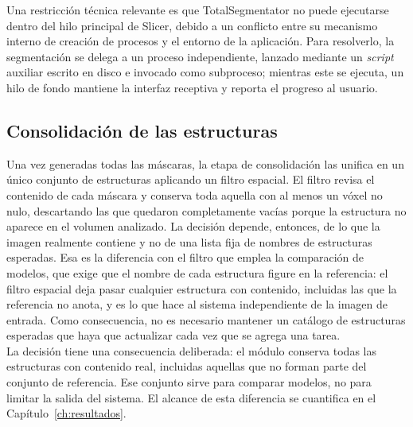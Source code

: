 Una restricción técnica relevante es que TotalSegmentator no puede ejecutarse dentro del hilo principal de Slicer, debido a un conflicto entre su mecanismo interno de creación de procesos y el entorno de la aplicación. Para resolverlo, la segmentación se delega a un proceso independiente, lanzado mediante un \textit{script} auxiliar escrito en disco e invocado como subproceso; mientras este se ejecuta, un hilo de fondo mantiene la interfaz receptiva y reporta el progreso al usuario.\\

\subsection{Consolidación de las estructuras}

Una vez generadas todas las máscaras, la etapa de consolidación las unifica en un único conjunto de estructuras aplicando un filtro espacial. El filtro revisa el contenido de cada máscara y conserva toda aquella con al menos un vóxel no nulo, descartando las que quedaron completamente vacías porque la estructura no aparece en el volumen analizado. La decisión depende, entonces, de lo que la imagen realmente contiene y no de una lista fija de nombres de estructuras esperadas. Esa es la diferencia con el filtro que emplea la comparación de modelos, que exige que el nombre de cada estructura figure en la referencia: el filtro espacial deja pasar cualquier estructura con contenido, incluidas las que la referencia no anota, y es lo que hace al sistema independiente de la imagen de entrada. Como consecuencia, no es necesario mantener un catálogo de estructuras esperadas que haya que actualizar cada vez que se agrega una tarea.\\

La decisión tiene una consecuencia deliberada: el módulo conserva todas las estructuras con contenido real, incluidas aquellas que no forman parte del conjunto de referencia. Ese conjunto sirve para comparar modelos, no para limitar la salida del sistema. El alcance de esta diferencia se cuantifica en el Capítulo~\ref{ch:resultados}.\\


